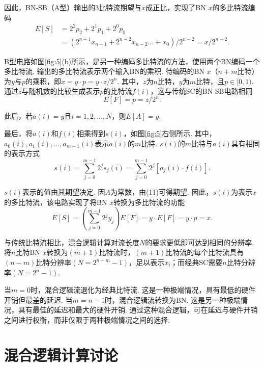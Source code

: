 \documentclass{solitairemiya-art}
\begin{document}
因此，BN-SB（A型）输出的3比特流期望与$x$成正比，实现了BN $x$的多比特流编码
\begin{equation}
\begin{aligned}
E[S] &= 2^2p_2 + 2^1p_1 + 2^0p_0 \\
&= (2^{n-1}x_{n-1} + 2^{n-2}x_{n-2} \ldots + x_0)/2^{n-2} = x/2^{n-2}.
\end{aligned}
\label{eq:8}
\end{equation}

B型电路如图\ref{fig:5}(b)所示，是另一种编码多比特流的方法，使用两个BN编码一个多比特流. 输出的多比特流表示两个输入BN的乘积. 待编码的BN $x$（$n+m$比特）为$y$与$p$的乘积，即$x = y \cdot p = y \cdot z/2^n$. 其中，$z$为$n$比特，$y$为$m$比特，且$p \in [0, 1)$. 通过$z$与随机数的比较生成表示$p$的比特流$f(i)$，这与传统SC的BN-SB电路相同
\begin{equation}
E[F] = p = z/2^n.
\label{eq:9}
\end{equation}

此后，若$a(i) = y$且$i = 1, 2, \ldots, N$，则$E[A] = y$. 

最后，将$a(i)$和$f(i)$相乘得到$s(i)$，如图\ref{fig:5}右侧所示. 其中，$a_0(i), a_1(i), \ldots, a_{m-1}(i)$表示$a(i)$的$m$比特. $s(i)$的$m$比特与$a(i)$具有相同的表示方式
\begin{equation}
s(i) = \sum_{j=0}^{m-1}2^js_j(i) = \sum_{j=0}^{m-1}2^j[a_j(i) \cdot f(i)].
\label{eq:10}
\end{equation}

$s(i)$表示的值由其期望决定. 因$A$为常数，由(11)可得期望. 因此，$s(i)$为表示$x$的多比特流，该电路实现了将BN $x$转换为多比特流的功能
\begin{equation}
E[S] = \left(\sum_{j=0}^{m-1}2^jy_j\right)E[F] = y \cdot E[F] = y \cdot p = x.
\label{eq:11}
\end{equation}

与传统比特流相比，混合逻辑计算对流长度$N$的要求更低即可达到相同的分辨率. 将$n$比特BN $x$转换为$(m+1)$比特流时，$(m+1)$比特流的每个比特流具有$(n-m)$比特分辨率$(N = 2^{n-m}-1)$，足以表示$x_i$；而经典SC需要$n$比特分辨率$(N = 2^n-1)$. 

当$m = 0$时，混合逻辑流退化为经典比特流. 这是一种极端情况，具有最低的硬件开销但最差的延迟. 当$m = n-1$时，混合逻辑流转换为BN. 这是另一种极端情况，具有最佳的延迟和最大的硬件开销. 通过这种混合逻辑，可在延迟与硬件开销之间进行权衡，而非仅限于两种极端情况之间的选择. 

\section{混合逻辑计算讨论}
\end{document}
